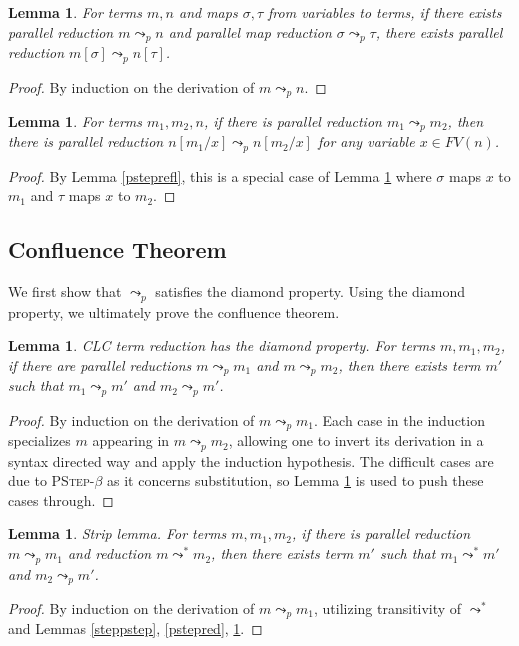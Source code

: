 \documentclass{article}
\newtheorem{lemma}[theorem]{Lemma}
\theoremstyle{definition}
\newcommand{\rname}[1]{\textsc{\footnotesize #1}}
\newcommand{\red}{\leadsto^*}
\newcommand{\pstep}{\leadsto_p}
\begin{document}
\begin{lemma}\label{pstepcompat}
  For terms $m, n$ and maps $\sigma, \tau$ from variables to terms, if there exists parallel reduction $m \pstep n$ and parallel map reduction $\sigma \pstep \tau$, there exists parallel reduction $m[\sigma] \pstep n[\tau]$.
\end{lemma}
\begin{proof}
  By induction on the derivation of $m \pstep n$.
\end{proof}

\begin{lemma}
  For terms $m_1, m_2, n$, if there is parallel reduction $m_1 \pstep m_2$, then there is parallel reduction $n[m_1/x] \pstep n[m_2/x]$ for any variable $x \in FV(n)$.
\end{lemma}
\begin{proof}
  By Lemma \ref{psteprefl}, this is a special case of Lemma \ref{pstepcompat} where $\sigma$ maps $x$ to $m_1$ and $\tau$ maps $x$ to $m_2$.
\end{proof}

\subsection{Confluence Theorem}
We first show that $\pstep$ satisfies the diamond property. Using the diamond property, we ultimately prove the confluence theorem.

\begin{lemma}\label{diamond}
  CLC term reduction has the diamond property. For terms $m, m_1, m_2$, if there are parallel reductions $m \pstep m_1$ and $m \pstep m_2$, then there exists term $m'$ such that $m_1 \pstep m'$ and $m_2 \pstep m'$.
\end{lemma}
\begin{proof}
  By induction on the derivation of $m \pstep m_1$. Each case in the induction specializes $m$ appearing in $m \pstep m_2$, allowing one to invert its derivation in a syntax directed way and apply the induction hypothesis. The difficult cases are due to \rname{PStep-$\beta$} as it concerns substitution, so Lemma \ref{pstepcompat} is used to push these cases through.
\end{proof}

\begin{lemma}\label{strip}
  Strip lemma. For terms $m, m_1, m_2$, if there is parallel reduction $m \pstep m_1$ and reduction $m \red m_2$, then there exists term $m'$ such that $m_1 \red m'$ and $m_2 \pstep m'$.
\end{lemma}
\begin{proof}
  By induction on the derivation of $m \pstep m_1$, utilizing transitivity of $\red$ and Lemmas \ref{steppstep}, \ref{pstepred}, \ref{diamond}.
\end{proof}
\end{document}
